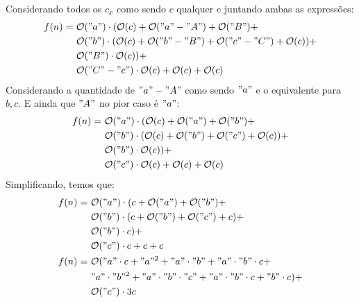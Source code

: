 \documentclass{article}
\begin{document}
Considerando todos os $c_x$ como sendo $c$ qualquer e juntando ambas as expressões:
\begin{align}
  \begin{split}
    f(n) =\ &{}       \mathcal{O}("a") \cdot (\mathcal{O}(c) + \mathcal{O}("a"-"A") + \mathcal{O}("B") + \\
                     &\mathcal{O}("b") \cdot (\mathcal{O}(c) + \mathcal{O}("b"-"B") + \mathcal{O}("c"-"C") + \mathcal{O}(c)) + \\
                     &\mathcal{O}("B") \cdot \mathcal{O}(c)) + \\
                     &\mathcal{O}("C"-"c") \cdot \mathcal{O}(c) + \mathcal{O}(c) + \mathcal{O}(c) \\
  \end{split}
\end{align}
Considerando a quantidade de $"a" - "A"$ como sendo $"a"$ e o equivalente para $b, c$. E ainda que $"A"$ no pior caso é $"a"$:
\begin{align}
  \begin{split}
    f(n) =\ &{}       \mathcal{O}("a") \cdot (\mathcal{O}(c) + \mathcal{O}("a") + \mathcal{O}("b") + \\
                     &\mathcal{O}("b") \cdot (\mathcal{O}(c) + \mathcal{O}("b") + \mathcal{O}("c") + \mathcal{O}(c)) + \\
                     &\mathcal{O}("b") \cdot \mathcal{O}(c)) + \\
                     &\mathcal{O}("c") \cdot \mathcal{O}(c) + \mathcal{O}(c) + \mathcal{O}(c) \\
  \end{split}
\end{align}
Simplificando, temos que:
\begin{align}
  \begin{split}
    f(n) =\ &{}       \mathcal{O}("a") \cdot (c + \mathcal{O}("a") + \mathcal{O}("b") + \\
                     &\mathcal{O}("b") \cdot (c + \mathcal{O}("b") + \mathcal{O}("c") + c) + \\
                     &\mathcal{O}("b") \cdot c) + \\
                     &\mathcal{O}("c") \cdot c + c + c \\
    f(n) =\ &{}       \mathcal{O}("a" \cdot c + "a"^2 + "a" \cdot "b" + "a"\cdot "b" \cdot c + \\
                     &"a"\cdot"b"^2 + "a" \cdot "b" \cdot "c" + "a" \cdot "b" \cdot c + "b" \cdot c) + \\
                     &\mathcal{O}("c") \cdot 3c
  \end{split}
\end{align}
\end{document}
